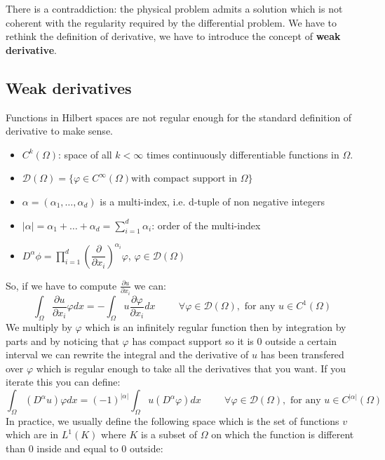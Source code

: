 There is a contraddiction: the physical problem admits a solution which is not coherent with the regularity required by the differential problem. We have to rethink the definition of derivative, we have to introduce the concept of \textbf{weak derivative}.\\

\subsection{Weak derivatives}
Functions in Hilbert spaces are not regular enough for the standard definition of derivative to make sense. 
\begin{itemize}
    \item $C^k(\Omega)$: space of all $k < \infty$ times continuously differentiable functions in $\Omega$.
    \item $\mathcal{D}(\Omega) = \{\varphi \in C^\infty(\Omega) \text{with compact support in }\Omega\}$
    \item $\alpha = (\alpha_1, \dots, \alpha_d)$ is a multi-index, i.e. d-tuple of non negative integers
    \item $|\alpha| = \alpha_1 + \dots + \alpha_d = \sum_{i=1}^{d} \alpha_i$: order of the multi-index
    \item $D^\alpha \phi = \prod\limits_{i=1}^{d}\left(\dfrac{\partial}{\partial x_i}\right)^{\alpha_i} \varphi$, \hspace{0.1cm} $\varphi \in \mathcal{D}(\Omega)$
\end{itemize}
So, if we have to compute $\frac{\partial u}{\partial x_i}$ we can:
\[
    \int_{\Omega} \dfrac{\partial u}{\partial x_i} \varphi dx =  - \int_{\Omega} u \dfrac{\partial \varphi}{\partial x_i} dx \hspace{1cm} \forall \varphi \in \mathcal{D}(\Omega), \text{ for any } u \in C^1(\Omega)    
\]
We multiply by $\varphi$ which is an infinitely regular function then by integration by parts and by noticing that $\varphi$ has compact support so it is 0 outside a certain interval we can rewrite the integral and the derivative of $u$ has been transfered over $\varphi$ which is regular enough to take all the derivatives that you want. If you iterate this you can define:
\[
    \int_{\Omega} (D^\alpha u)\varphi dx = (-1)^{|\alpha|}\int_{\Omega} u(D^\alpha \varphi) dx \hspace{1cm} \forall \varphi \in \mathcal{D}(\Omega), \text{ for any } u \in C^{|\alpha|}(\Omega)    
\]
In practice, we usually define the following space which is the set of functions $v$ which are in $L^1(K)$ where $K$ is a subset of $\Omega$ on which the function is different than 0 inside and equal to 0 outside: 
